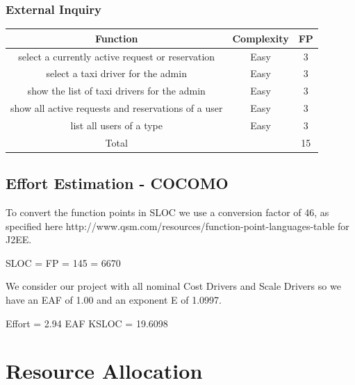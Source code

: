 \documentclass{article}
\begin{document}
\subsubsection{External Inquiry}
\begin{table}[H]
\begin{adjustbox}{width=1.2\textwidth}
\begin{tabular}{*{3}{c}}
\toprule
Function & Complexity & FP \\
\midrule
select a currently active request or reservation&Easy&3\\
select a taxi driver for the admin&Easy&3\\
show the list of taxi drivers for the admin&Easy&3\\
show all active requests and reservations of a user&Easy&3\\
list all users of a type&Easy&3\\
\midrule
Total & & 15\\
\bottomrule
\end{tabular}
\end{adjustbox}
\end{table}
\subsection{Effort Estimation - COCOMO}
To convert the function points in SLOC we use a 
conversion factor of 46, as specified here 
http://www.qsm.com/resources/function-point-languages-table
for J2EE.
\begin{center}
	SLOC = FP  = 145  = 6670
\end{center}
We consider our project with all nominal Cost Drivers and
Scale Drivers so we have an EAF of 1.00 and an
exponent E of 1.0997.
\begin{center}
	Effort = 2.94 \texttimes EAF  KSLOC = 19.6098
\end{center}
\section{Resource Allocation}
\end{document}

